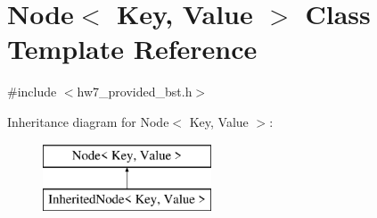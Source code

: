 \hypertarget{classNode}{}\section{Node$<$ Key, Value $>$ Class Template Reference}
\label{classNode}


{\ttfamily \#include $<$hw7\+\_\+provided\+\_\+bst.\+h$>$}

Inheritance diagram for Node$<$ Key, Value $>$\+:\begin{figure}[H]
\begin{center}
\leavevmode
\includegraphics[height=2.000000cm]{classNode}
\end{center}
\end{figure}
